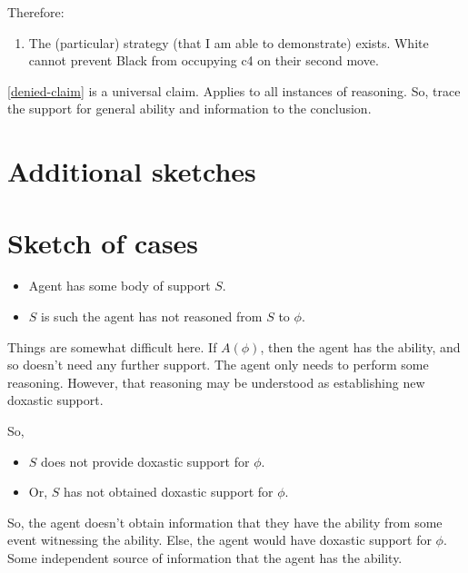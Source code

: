 \begin{note}
  Therefore:

  \begin{enumerate}[resume, label=(S\arabic*), ref=(S\arabic*)]
  \item\label{inf:sse} The (particular) strategy (that I am able to demonstrate) exists.\newline
    White cannot prevent Black from occupying c4 on their second move.
  \end{enumerate}
\end{note}

\begin{note}
  \ref{denied-claim} is a universal claim.
  Applies to all instances of reasoning.
  So, trace the support for general ability and information to the conclusion.
\end{note}

\section{Additional sketches}
\label{sec:additional-sketches}


\newpage

\section{Sketch of cases}
\label{sec:sketch-cases}

\begin{itemize}
\item Agent has some body of support \(S\).
\item \(S\) is such the agent has not reasoned from \(S\) to \(\phi\).
\end{itemize}

Things are somewhat difficult here.
If \(A(\phi)\), then the agent has the ability, and so doesn't need any further support.
The agent only needs to perform some reasoning.
However, that reasoning may be understood as establishing new doxastic support.

So,

\begin{itemize}
\item \(S\) does not provide doxastic support for \(\phi\).
\item Or, \(S\) has not obtained doxastic support for \(\phi\).
\end{itemize}

So, the agent doesn't obtain information that they have the ability from some event witnessing the ability.
Else, the agent would have doxastic support for \(\phi\).
Some independent source of information that the agent has the ability.

